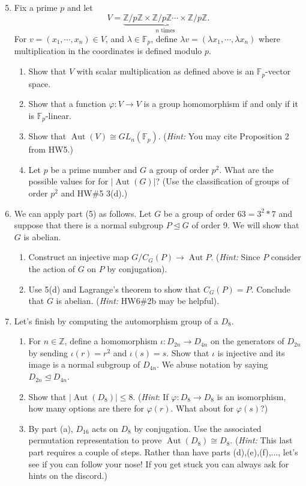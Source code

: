 \documentclass[11pt]{article}
\newcommand{\Aut}{\operatorname{Aut}}
\newcommand{\bF}{\mathbb{F}}
\newcommand{\bZ}{\mathbb{Z}}
\begin{document}
\begin{enumerate}
  \setcounter{enumi}{4}
  \item Fix a prime $p$ and let
  \[V = \underbrace{\bZ/p\bZ\times\bZ/p\bZ\cdots\times\bZ/p\bZ}_{n\text{ times}}.\]
  For $v = (x_1,\cdots,x_n)\in V$, and $\lambda\in\bF_p$, define $\lambda v = (\lambda x_1,\cdots,\lambda x_n)$ where multiplication in the coordinates is defined modulo $p$.
  \begin{enumerate}
    \item Show that $V$ with scalar multiplication as defined above is an $\bF_p$-vector space.
    \item Show that a function $\varphi:V\to V$ is a group homomorphism if and only if it is $\bF_p$-linear.
    \item Show that $\Aut(V)\cong GL_n(\bF_p)$.  (\textit{Hint:} You may cite Proposition 2 from HW5.)
    \item Let $p$ be a prime number and $G$ a group of order $p^2$.  What are the possible values for for $|\Aut(G)|$?  (Use the classification of groups of order $p^2$ and HW\#5 3(d).)
  \end{enumerate}
  \item We can apply part (5) as follows.  Let $G$ be a group of order $63 = 3^2*7$ and suppose that there is a normal subgroup $P\unlhd G$ of order 9.  We will show that $G$ is abelian.
  \begin{enumerate}
    \item Construct an injective map $G/C_G(P)\to\Aut P$.  (\textit{Hint:} Since $P$ consider the action of $G$ on $P$ by conjugation).
    \item Use 5(d) and Lagrange's theorem to show that $C_G(P) = P$.  Conclude that $G$ is abelian.  (\textit{Hint:} HW6\#2b may be helpful).
  \end{enumerate}
  \item Let's finish by computing the automorphism group of a $D_8$.
  \begin{enumerate}
    \item For $n\in\bZ$, define a homomorphism $\iota:D_{2n}\to D_{4n}$ on the generators of $D_{2n}$ by sending $\iota(r)=r^2$ and $\iota(s)=s$.  Show that $\iota$ is injective and its image is a normal subgroup of $D_{4n}$.  We abuse notation by saying $D_{2n}\unlhd D_{4n}$.
    \item Show that $|\Aut(D_8)|\le 8$.  (\textit{Hint}: If $\varphi:D_8\to D_8$ is an isomorphism, how many options are there for $\varphi(r)$.  What about for $\varphi(s)$?)
    \item By part (a), $D_{16}$ acts on $D_8$ by conjugation.  Use the associated permutation representation to prove $\Aut(D_8) \cong D_8$.  (\textit{Hint:} This last part requires a couple of steps.  Rather than have parts (d),(e),(f),..., let's see if you can follow your nose!  If you get stuck you can always ask for hints on the discord.)
  \end{enumerate}
\end{enumerate}
\end{document}
